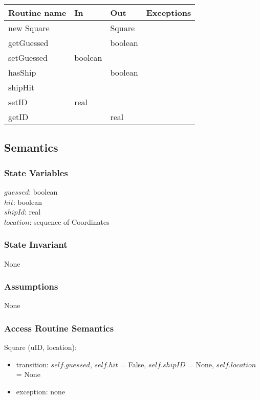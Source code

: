 \documentclass[12pt,fleqn]{article}
\begin{document}
    \begin{tabular}{| l | l | l | l |}
    \hline
    \textbf{Routine name} & \textbf{In} & \textbf{Out} & \textbf{Exceptions}\\
    \hline
    new Square & ~ & Square & ~\\
    \hline
    getGuessed & ~ & boolean & ~\\
    \hline
    setGuessed & boolean & ~ & ~\\
    \hline
    hasShip & ~ & boolean & ~\\
    \hline
    shipHit & ~ & ~ & ~\\
    \hline
    setID & real & ~ & ~\\    
    \hline
    getID & ~ & real & ~\\    
    \hline

    \hline

    \end{tabular}

    \subsection* {Semantics}

    \subsubsection* {State Variables}
    $guessed$: boolean\\
    $hit$: boolean\\
    $shipId$: real \\
    $location$: sequence of Coordinates 

    \subsubsection* {State Invariant}
    None

    \subsubsection* {Assumptions}
    None

    \subsubsection* {Access Routine Semantics}

    Square (uID, location):
    \begin{itemize}
    \item transition: $self.guessed$, $self.hit$ = False, $self.shipID$ = None, $self.location$ = None
    \item exception: none
    \end{itemize}
\end{document}
